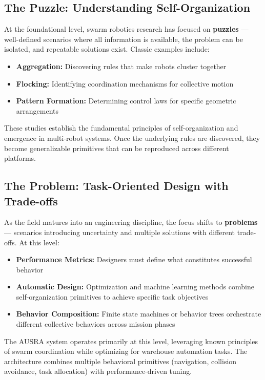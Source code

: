\subsection{The Puzzle: Understanding Self-Organization}
\label{subsec:puzzle}

At the foundational level, swarm robotics research has focused on \textbf{puzzles} --- well-defined scenarios where all information is available, the problem can be isolated, and repeatable solutions exist. Classic examples include:

\begin{itemize}
    \item \textbf{Aggregation:} Discovering rules that make robots cluster together
    \item \textbf{Flocking:} Identifying coordination mechanisms for collective motion
    \item \textbf{Pattern Formation:} Determining control laws for specific geometric arrangements
\end{itemize}

These studies establish the fundamental principles of self-organization and emergence in multi-robot systems. Once the underlying rules are discovered, they become generalizable primitives that can be reproduced across different platforms.

\subsection{The Problem: Task-Oriented Design with Trade-offs}
\label{subsec:problem}

As the field matures into an engineering discipline, the focus shifts to \textbf{problems} --- scenarios introducing uncertainty and multiple solutions with different trade-offs. At this level:

\begin{itemize}
    \item \textbf{Performance Metrics:} Designers must define what constitutes successful behavior
    \item \textbf{Automatic Design:} Optimization and machine learning methods combine self-organization primitives to achieve specific task objectives
    \item \textbf{Behavior Composition:} Finite state machines or behavior trees orchestrate different collective behaviors across mission phases
\end{itemize}

The AUSRA system operates primarily at this level, leveraging known principles of swarm coordination while optimizing for warehouse automation tasks. The architecture combines multiple behavioral primitives (navigation, collision avoidance, task allocation) with performance-driven tuning.

